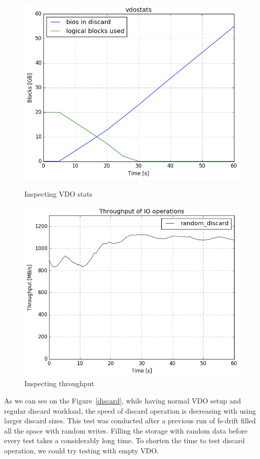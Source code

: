 \documentclass[
  color, %
  table, %
  lof,   %
  lot,   %
]{fithesis3}
\begin{document}
\begin{figure}[!htb]
        \centering
        \includegraphics[width=\textwidth]{../results/discards/full_VDO/report/tar_184_vdostats}
\caption[Discards]{Inspecting VDO stats}
\label{fig:discard-full-vdostats}
        \centering
        \includegraphics[width=\textwidth]{../results/discards/full_VDO/report/tar_184_bw.png}
\caption[Discards]{Inspecting throughput}
\label{fig:discard-full-througput}
\end{figure}

As we can see on the Figure~\ref{discard}, while having normal VDO setup and regular discard workload, the speed of discard operation is decreasing with using larger discard sizes. This test was conducted after a previous run of fs-drift filled all the space with random writes. Filling the storage with random data before every test takes a considerably long time. To shorten the time to test discard operation, we could try testing with empty VDO.
\end{document}
